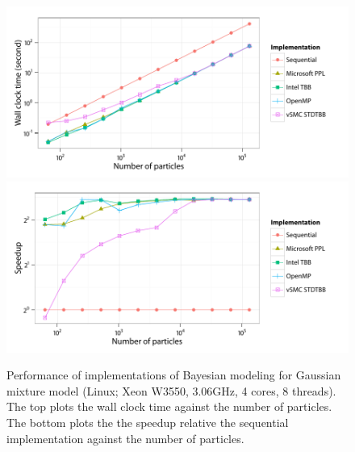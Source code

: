 \begin{figure}
  \UseAltLinespread
  \includegraphics[width=\linewidth]{fig_src/bench-smp-time-running}
  \includegraphics[width=\linewidth]{fig_src/bench-smp-speedup-running}
  \caption[Performance of \protect\vsmc \protect\smp implementations]
  {Performance of \cpp implementations of Bayesian modeling for Gaussian mixture model (Linux; Xeon W3550, 3.06GHz, 4 cores, 8 threads). The top plots the wall clock time against the number of particles. The bottom plots the the speedup relative the sequential implementation against the number of particles.}
  \label{fig:bench-smp-perf}
\end{figure}
